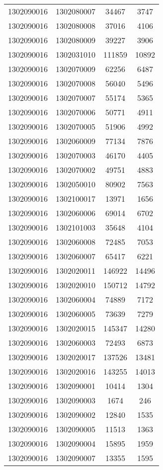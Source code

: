 \begin{longtable}{llcc}
1302090016 & 1302080007 & 34467 & 3747\\
1302090016 & 1302080008 & 37016 & 4106\\
1302090016 & 1302080009 & 39227 & 3906\\
1302090016 & 1302031010 & 111859 & 10892\\
1302090016 & 1302070009 & 62256 & 6487\\
1302090016 & 1302070008 & 56040 & 5496\\
1302090016 & 1302070007 & 55174 & 5365\\
1302090016 & 1302070006 & 50771 & 4911\\
1302090016 & 1302070005 & 51906 & 4992\\
1302090016 & 1302060009 & 77134 & 7876\\
1302090016 & 1302070003 & 46170 & 4405\\
1302090016 & 1302070002 & 49751 & 4883\\
1302090016 & 1302050010 & 80902 & 7563\\
1302090016 & 1302100017 & 13971 & 1656\\
1302090016 & 1302060006 & 69014 & 6702\\
1302090016 & 1302101003 & 35648 & 4104\\
1302090016 & 1302060008 & 72485 & 7053\\
1302090016 & 1302060007 & 65417 & 6221\\
1302090016 & 1302020011 & 146922 & 14496\\
1302090016 & 1302020010 & 150712 & 14792\\
1302090016 & 1302060004 & 74889 & 7172\\
1302090016 & 1302060005 & 73639 & 7279\\
1302090016 & 1302020015 & 145347 & 14280\\
1302090016 & 1302060003 & 72493 & 6873\\
1302090016 & 1302020017 & 137526 & 13481\\
1302090016 & 1302020016 & 143255 & 14013\\
1302090016 & 1302090001 & 10414 & 1304\\
1302090016 & 1302090003 & 1674 & 246\\
1302090016 & 1302090002 & 12840 & 1535\\
1302090016 & 1302090005 & 11513 & 1363\\
1302090016 & 1302090004 & 15895 & 1959\\
1302090016 & 1302090007 & 13355 & 1595\\

\end{longtable}

